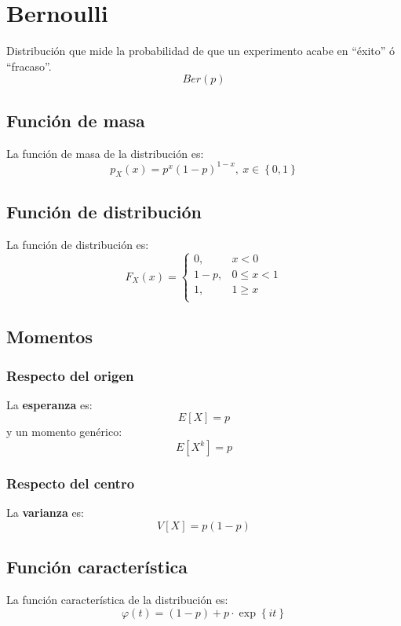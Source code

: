 \section{Bernoulli}
\label{sec:bernoulli}
Distribución que mide la probabilidad de que un experimento acabe en ``éxito'' ó 
``fracaso''. 
\[
\boxed{Ber\left( p \right)}
\]

\subsection{Función de masa}
La función de masa de la distribución es:
\[
p_X \left( x \right) = p^x \left( 1-p \right)^{1-x},\ x \in \left\{ 0, 1 \right\}
\]

\subsection{Función de distribución}
La función de distribución es:
\[
F_X\left( x \right) = \begin{cases}
    0, &x < 0\\ 
    1 - p, &0 \le x < 1\\
    1, &1 \ge x \\
\end{cases}
\]

\subsection{Momentos}

\subsubsection*{Respecto del origen}
La \textbf{esperanza} es: 
\[
    E\left[ X \right] = p
\]
y un momento genérico: 
\[
    E\left[ X^k \right] = p
\]
\subsubsection*{Respecto del centro}
La \textbf{varianza} es:
\[
    V\left[ X \right] = p\left( 1-p \right)
\]

\subsection{Función característica}
La función característica de la distribución es:
\[
\varphi\left( t \right) = \left( 1-p \right) + p \cdot \exp\left\{ it \right\}
\]

